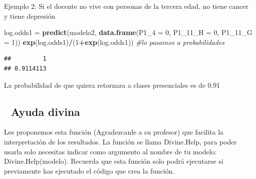 \documentclass[
]{article}
\newenvironment{Shaded}{\begin{snugshade}}{\end{snugshade}}
\newcommand{\AttributeTok}[1]{\textcolor[rgb]{0.13,0.29,0.53}{#1}}
\newcommand{\CommentTok}[1]{\textcolor[rgb]{0.56,0.35,0.01}{\textit{#1}}}
\newcommand{\DecValTok}[1]{\textcolor[rgb]{0.00,0.00,0.81}{#1}}
\newcommand{\FunctionTok}[1]{\textcolor[rgb]{0.13,0.29,0.53}{\textbf{#1}}}
\newcommand{\NormalTok}[1]{#1}
\newcommand{\OtherTok}[1]{\textcolor[rgb]{0.56,0.35,0.01}{#1}}
\newcommand{\SpecialCharTok}[1]{\textcolor[rgb]{0.81,0.36,0.00}{\textbf{#1}}}
\begin{document}
Ejemplo 2: Si el docente no vive con personas de la tercera edad, no
tiene cancer y tiene depresión

\begin{Shaded}
\begin{Highlighting}[]
\NormalTok{log.odds1 }\OtherTok{=} \FunctionTok{predict}\NormalTok{(modelo2, }\FunctionTok{data.frame}\NormalTok{(}\AttributeTok{P1\_4 =} \DecValTok{0}\NormalTok{, }\AttributeTok{P1\_11\_H =} \DecValTok{0}\NormalTok{, }\AttributeTok{P1\_11\_G =} \DecValTok{1}\NormalTok{))}
\FunctionTok{exp}\NormalTok{(log.odds1)}\SpecialCharTok{/}\NormalTok{(}\DecValTok{1}\SpecialCharTok{+}\FunctionTok{exp}\NormalTok{(log.odds1)) }\CommentTok{\#lo pasamos a probabilidades}
\end{Highlighting}
\end{Shaded}

\begin{verbatim}
##         1 
## 0.9114113
\end{verbatim}

La probabilidad de que quiera retornara a clases presenciales es de 0.91

\hypertarget{ayuda-divina}{%
\subsection{🙌 Ayuda divina 🙌}\label{ayuda-divina}}

Les proponemos esta función (Agradezcanle a su profesor) que facilita la
interpretación de los resultados. La función se llama Divine.Help, para
poder usarla solo necesitas indicar como argumento al nombre de tu
modelo: Divine.Help(modelo). Recuerda que esta función solo podrá
ejecutarse si previamente has ejecutado el código que crea la función.
\end{document}

